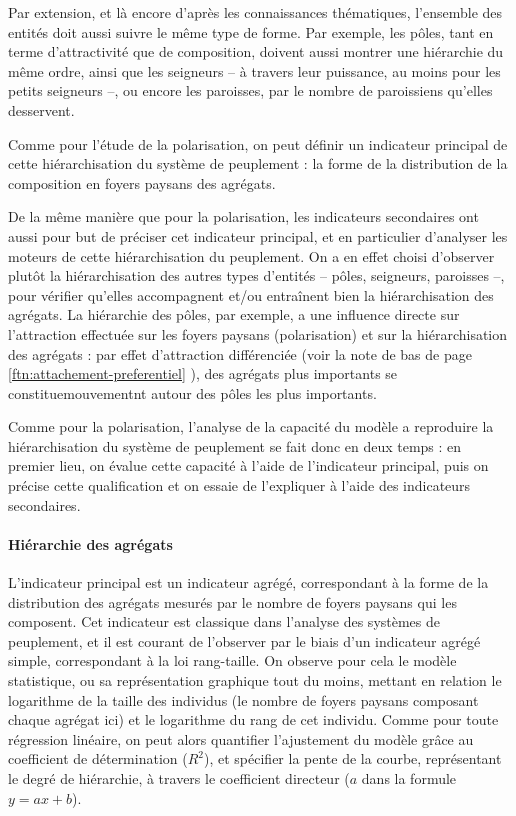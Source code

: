 Par extension, et là encore d'après les connaissances thématiques, l'ensemble des entités doit aussi suivre le même type de forme.
Par exemple, les pôles, tant en terme d'attractivité que de composition, doivent aussi montrer une hiérarchie du même ordre, ainsi que les seigneurs -- à travers leur puissance, au moins pour les petits seigneurs --, ou encore les paroisses, par le nombre de paroissiens qu'elles desservent.

Comme pour l'étude de la polarisation, on peut définir un indicateur principal de cette hiérarchisation du système de peuplement :
la forme de la distribution de la composition en foyers paysans des agrégats.

De la même manière que pour la polarisation, les indicateurs secondaires ont aussi pour but de préciser cet indicateur principal, et en particulier d'analyser les moteurs de cette hiérarchisation du peuplement.
On a en effet choisi d'observer plutôt la hiérarchisation des autres types d'entités -- pôles, seigneurs, paroisses --, pour vérifier qu'elles accompagnent et/ou entraînent bien la hiérarchisation des agrégats.
La hiérarchie des pôles, par exemple, a une influence directe sur l'attraction effectuée sur les foyers paysans (polarisation) et sur la hiérarchisation des agrégats :
par effet d'attraction différenciée (voir la note de bas de page \ref{ftn:attachement-preferentiel} ), des agrégats plus importants se constituemouvementnt autour des pôles les plus importants.

Comme pour la polarisation, l'analyse de la capacité du modèle a reproduire la hiérarchisation du système de peuplement se fait donc en deux temps :
en premier lieu, on évalue cette capacité à l'aide de l'indicateur principal, puis on précise cette qualification et on essaie de l'expliquer à l'aide des indicateurs secondaires.


\paragraph{Hiérarchie des agrégats}

L'indicateur principal est un indicateur agrégé, correspondant à la forme de la distribution des agrégats mesurés par le nombre de foyers paysans qui les composent.
Cet indicateur est classique dans l'analyse des systèmes de peuplement, et il est courant de l'observer par le biais d'un indicateur agrégé simple, correspondant à la loi rang-taille.
On observe pour cela le modèle statistique, ou sa représentation graphique tout du moins, mettant en relation le logarithme de la taille des individus (le nombre de foyers paysans composant chaque agrégat ici) et le logarithme du rang de cet individu.
Comme pour toute régression linéaire, on peut alors quantifier l'ajustement du modèle grâce au coefficient de détermination ($R^2$), et spécifier la pente de la courbe, représentant le degré de hiérarchie, à travers le coefficient directeur ($a$ dans la formule $y = ax + b$).

